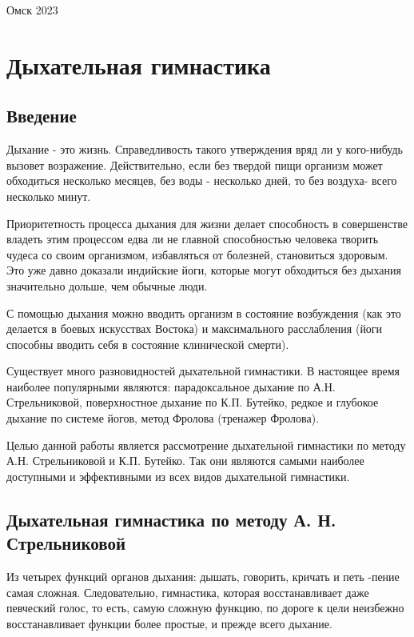 \documentclass[a4paper]{article}
\begin{document}
    \vspace*{\fill}
    \begin{center}
        Омск 2023
    \end{center}

    \newpage

    \tableofcontents

    \newpage

    \section{Дыхательная гимнастика}

    \subsection{Введение}
    Дыхание - это жизнь. Справедливость такого утверждения вряд ли у кого-нибудь вызовет возражение. Действительно, если без твердой пищи организм может обходиться несколько месяцев, без воды - несколько дней, то без воздуха- всего несколько минут.

    Приоритетность процесса дыхания для жизни делает способность в совершенстве владеть этим процессом едва ли не главной способностью человека творить чудеса со своим организмом, избавляться от болезней, становиться здоровым. Это уже давно доказали индийские йоги, которые могут обходиться без дыхания значительно дольше, чем обычные люди.

    С помощью дыхания можно вводить организм в состояние возбуждения (как это делается в боевых искусствах Востока) и максимального расслабления (йоги способны вводить себя в состояние клинической смерти).

    Существует много разновидностей дыхательной гимнастики. В настоящее время наиболее популярными являются: парадоксальное дыхание по А.Н. Стрельниковой, поверхностное дыхание по К.П. Бутейко, редкое и глубокое дыхание по системе йогов, метод Фролова (тренажер Фролова).

    Целью данной работы является рассмотрение дыхательной гимнастики по методу А.Н. Стрельниковой и К.П. Бутейко. Так они являются самыми наиболее доступными и эффективными из всех видов дыхательной гимнастики.

    \subsection{Дыхательная гимнастика по методу А. Н. Стрельниковой}
    Из четырех функций органов дыхания: дышать, говорить, кричать и петь -пение самая сложная. Следовательно, гимнастика, которая восстанавливает даже певческий голос, то есть, самую сложную функцию, по дороге к цели неизбежно восстанавливает функции более простые, и прежде всего дыхание.
\end{document}
